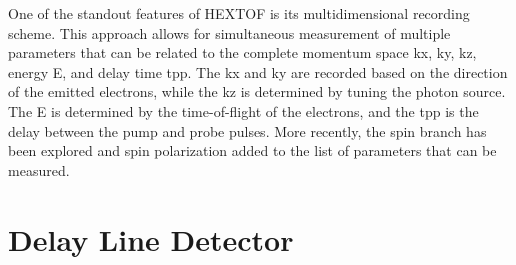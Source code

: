 One of the standout features of \gls{HEXTOF} is its multidimensional recording scheme. This approach allows for simultaneous measurement of multiple parameters that can be related to the complete momentum space \gls{kx}, \gls{ky}, \gls{kz}, energy \gls{E}, and delay time \gls{tpp}. The \gls{kx} and \gls{ky} are recorded based on the direction of the emitted electrons, while the \gls{kz} is determined by tuning the photon source. The \gls{E} is determined by the time-of-flight of the electrons, and the \gls{tpp} is the delay between the pump and probe pulses. More recently, the spin branch has been explored and spin polarization added to the list of parameters that can be measured. 

\section{Delay Line Detector}\label{section:dld}

